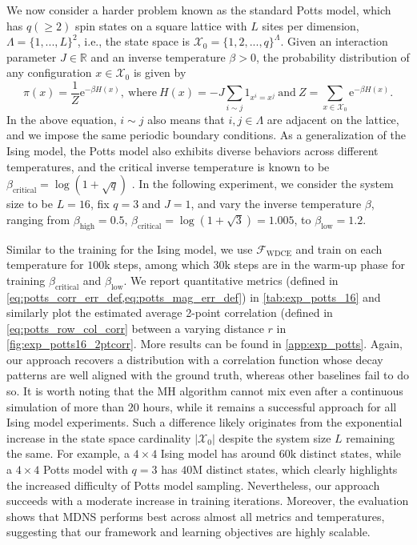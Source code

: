 \documentclass{article}
\theoremstyle{remark}
\newcommand{\e}{\mathrm{e}}
\newcommand{\R}{\mathbb{R}}
\newcommand{\cF}{\mathcal{F}}
\newcommand{\cX}{\mathcal{X}}
\newcommand{\betah}{\beta_\mathrm{high}}
\newcommand{\betac}{\beta_\mathrm{critical}}
\newcommand{\betal}{\beta_\mathrm{low}}
\begin{document}
We now consider a harder problem known as the standard Potts model, which has $q(\ge2)$ spin states on a square lattice with $L$ sites per dimension, $\Lambda=\{1,...,L\}^2$, i.e., the state space is $\cX_0=\{1,2,...,q\}^\Lambda$. Given an interaction parameter $J\in\R$ and an inverse temperature $\beta>0$, the probability distribution of any configuration $x\in\cX_0$ is given by
\begin{equation}
    \pi(x)=\frac{1}{Z}\e^{-\beta H(x)},~\text{where}~H(x)=-J\sum_{i\sim j}1_{x^i=x^j}~\text{and}~Z=\sum_{x\in\cX_0}\e^{-\beta H(x)}.
    \label{eq:potts}
\end{equation}
%
In the above equation, $i\sim j$ also means that $i,j\in\Lambda$ are adjacent on the lattice, and we impose the same periodic boundary conditions. As a generalization of the Ising model, the Potts model also exhibits diverse behaviors across different temperatures, and the critical inverse temperature is known to be $\betac=\log(1+\sqrt{q})$ \cite{beffara2012self}. In the following experiment, we consider the system size to be $L=16$, fix $q=3$ and $J=1$, and vary the inverse temperature $\beta$, ranging from $\betah=0.5$, $\betac=\log(1+\sqrt3)=1.005$, to $\betal=1.2$.

Similar to the training for the Ising model, we use $\cF_{\mathrm{WDCE}}$ and train on each temperature for $100\mathrm{k}$ steps, among which $30\mathrm{k}$ steps are in the warm-up phase for training $\betac$ and $\betal$. We report quantitative metrics (defined in \cref{eq:potts_corr_err_def,eq:potts_mag_err_def}) in \cref{tab:exp_potts_16} and similarly plot the estimated average 2-point correlation (defined in \eqref{eq:potts_row_col_corr} between a varying distance $r$ in \cref{fig:exp_potts16_2ptcorr}. More results can be found in \cref{app:exp_potts}. Again, our approach recovers a distribution with a correlation function whose decay patterns are well aligned with the ground truth, whereas other baselines fail to do so. It is worth noting that the MH algorithm cannot mix even after a continuous simulation of more than $20$ hours, while it remains a successful approach for all Ising model experiments. Such a difference likely originates from the exponential increase in the state space cardinality $|\cX_0|$ despite the system size $L$ remaining the same. For example, a $4 \times 4$ Ising model has around $60\mathrm{k}$ distinct states, while a $4\times 4$ Potts model with $q = 3$ has $40\mathrm{M}$ distinct states, which clearly highlights the increased difficulty of Potts model sampling. Nevertheless, our approach succeeds with a moderate increase in training iterations. Moreover, the evaluation shows that MDNS performs best across almost all metrics and temperatures, suggesting that our framework and learning objectives are highly scalable.
\end{document}
